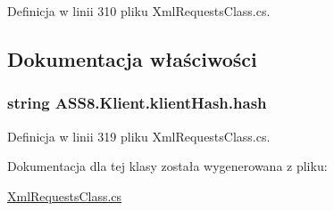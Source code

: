 Definicja w linii 310 pliku XmlRequestsClass.cs.

\subsection{Dokumentacja właściwości}
\hypertarget{a00008_5a3e998f66ab41fb3d9be69da9f6957d}{
\subsubsection[{hash}]{\setlength{\rightskip}{0pt plus 5cm}string ASS8.Klient.klientHash.hash}}
\label{d4/dee/a00008_5a3e998f66ab41fb3d9be69da9f6957d}




Definicja w linii 319 pliku XmlRequestsClass.cs.

Dokumentacja dla tej klasy została wygenerowana z pliku:\begin{CompactItemize}
\item 
\hyperlink{a00055}{XmlRequestsClass.cs}\end{CompactItemize}
